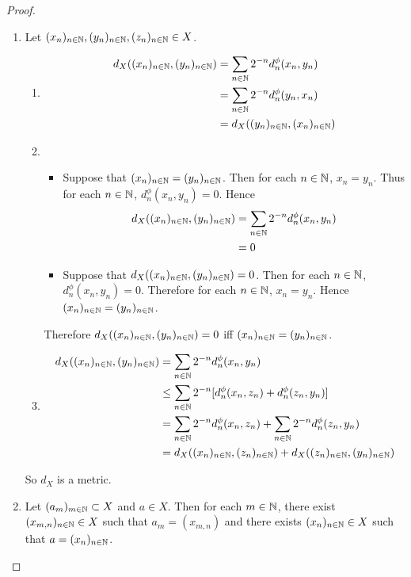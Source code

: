 \documentclass{book}
\begin{document}
\begin{proof}\
	\begin{enumerate}
		\item Let $(x_n)_{n \in \mathbb{N}}, (y_n)_{n \in \mathbb{N}}, (z_n)_{n \in \mathbb{N}} \in X$. 
		\begin{enumerate}
			\item 
			\begin{align*}
				d_X((x_n)_{n \in \mathbb{N}}, (y_n)_{n \in \mathbb{N}})
				& = \sum_{n \in \mathbb{N}} 2^{-n} d_n^{\phi}(x_n, y_n) \\
				& = \sum_{n \in \mathbb{N}} 2^{-n} d_n^{\phi}(y_n, x_n) \\
				& = d_X((y_n)_{n \in \mathbb{N}}, (x_n)_{n \in \mathbb{N}})
			\end{align*}
			\item 
			\begin{itemize}
				\item Suppose that $(x_n)_{n \in \mathbb{N}} = (y_n)_{n \in \mathbb{N}}$. Then for each $n \in \mathbb{N}$, $x_n = y_n$. Thus for each $n \in \mathbb{N}$, $d_n^{\phi}(x_n, y_n) = 0$. Hence
				\begin{align*}
					d_X((x_n)_{n \in \mathbb{N}}, (y_n)_{n \in \mathbb{N}})
					& = \sum_{n \in \mathbb{N}} 2^{-n} d_n^{\phi}(x_n, y_n) \\
					& = 0
				\end{align*}
				\item Suppose that $d_X((x_n)_{n \in \mathbb{N}}, (y_n)_{n \in \mathbb{N}}) = 0$. Then for each $n \in \mathbb{N}$, $d_n^{\phi}(x_n, y_n) = 0$. Therefore for each $n \in \mathbb{N}$, $x_n = y_n$. Hence $(x_n)_{n \in \mathbb{N}} = (y_n)_{n \in \mathbb{N}}$.
			\end{itemize}
			Therefore $d_X((x_n)_{n \in \mathbb{N}}, (y_n)_{n \in \mathbb{N}}) = 0$ iff $(x_n)_{n \in \mathbb{N}} = (y_n)_{n \in \mathbb{N}}$.
			\item 
			\begin{align*}
				d_X((x_n)_{n \in \mathbb{N}}, (y_n)_{n \in \mathbb{N}})
				& = \sum_{n \in \mathbb{N}} 2^{-n} d_n^{\phi}(x_n, y_n) \\
				& \leq \sum_{n \in \mathbb{N}} 2^{-n} [d_n^{\phi}(x_n, z_n) + d_n^{\phi}(z_n, y_n)] \\
				& = \sum_{n \in \mathbb{N}} 2^{-n} d_n^{\phi}(x_n, z_n) + \sum_{n \in \mathbb{N}} 2^{-n} d_n^{\phi}(z_n, y_n) \\
				& = d_X((x_n)_{n \in \mathbb{N}}, (z_n)_{n \in \mathbb{N}}) + d_X((z_n)_{n \in \mathbb{N}}, (y_n)_{n \in \mathbb{N}})
			\end{align*}
		\end{enumerate}
		So $d_X$ is a metric. 
		\item Let $(a_m)_{m \in \mathbb{N}} \subset X$ and $a \in X$. Then for each $m \in \mathbb{N}$, there exist $(x_{m,n})_{n \in \mathbb{N}} \in X$ such that $a_m = (x_{m,n})$ and there exists $(x_n)_{n \in \mathbb{N}} \in X$ such that $a = (x_n)_{n \in \mathbb{N}}$.

\end{enumerate}
\end{proof}
\end{document}
